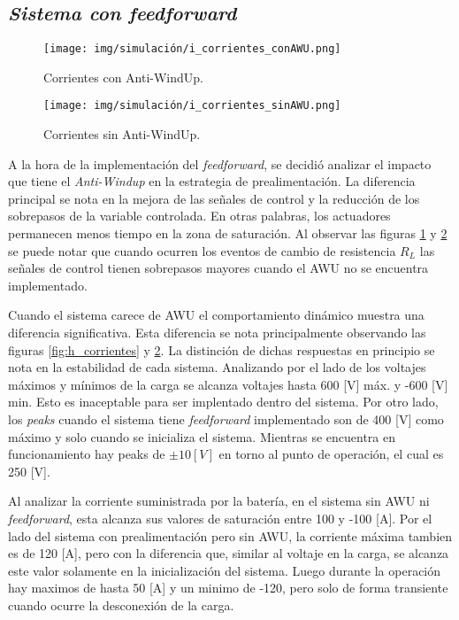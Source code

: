 \subsection{\textit{Sistema con feedforward}}

\begin{figure}[H]
    \centering
    \texttt{[image: img/simulación/i\_corrientes\_conAWU.png]}
    \caption{Corrientes con Anti-WindUp.}
    \label{fig:i_corrientes_conAWU}
\end{figure}

\begin{figure}[H]
    \centering
    \texttt{[image: img/simulación/i\_corrientes\_sinAWU.png]}
    \caption{Corrientes sin Anti-WindUp.}
    \label{fig:i_corrientes_sinAWU}
\end{figure}

A la hora de la implementación del \textit{feedforward}, se decidió 
analizar el impacto que tiene el \textit{Anti-Windup} en la estrategia de prealimentación.
La diferencia principal se nota en la mejora de las señales de control y la reducción de los sobrepasos de la 
variable controlada. En otras palabras, los actuadores permanecen menos tiempo en la zona de saturación.
Al observar las figuras \ref{fig:i_corrientes_conAWU} y \ref{fig:i_corrientes_sinAWU}
se puede notar que cuando ocurren los eventos de cambio de resistencia $R_L$ las señales de control
tienen sobrepasos mayores cuando el AWU no se encuentra implementado. 

Cuando el sistema carece de AWU el comportamiento dinámico 
muestra una diferencia significativa. Esta diferencia se nota principalmente observando las 
figuras \ref{fig:h_corrientes} y \ref{fig:i_corrientes_sinAWU}.
La distinción de dichas respuestas en principio se nota en la estabilidad de cada sistema. Analizando por el lado de los
voltajes máximos y mínimos de la carga se alcanza voltajes hasta 600 [V] máx. y -600 [V] min. Esto es inaceptable
para ser implentado dentro del sistema. Por otro lado, los \textit{peaks} cuando el sistema tiene \textit{feedforward}
implementado son de 400 [V] como máximo y solo cuando se inicializa el sistema. Mientras se encuentra en funcionamiento
hay peaks de $\pm 10 [V]$ en torno al punto de operación, el cual es 250 [V].

Al analizar la corriente suministrada por la batería, en el sistema sin AWU ni \textit{feedforward}, esta alcanza sus
valores de saturación entre 100 y -100 [A]. Por el lado del sistema con prealimentación pero sin AWU, la corriente máxima
tambien es de 120 [A], pero con la diferencia que, similar al voltaje en la carga, se alcanza este valor solamente en
la inicialización del sistema. Luego durante la operación hay maximos de hasta 50 [A] y un minimo de -120, pero solo de forma 
transiente cuando ocurre la desconexión de la carga.


